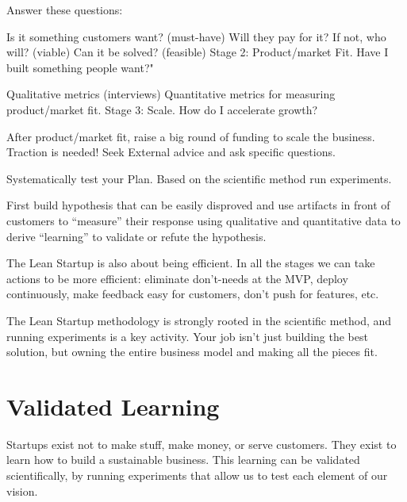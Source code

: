 Answer these questions:

Is it something customers want? (must-have)
Will they pay for it? If not, who will? (viable)
Can it be solved? (feasible)
Stage 2: Product/market Fit.
Have I built something people want?"

Qualitative metrics (interviews)
Quantitative metrics for measuring product/market fit.
Stage 3: Scale.
How do I accelerate growth?

After product/market fit, raise a big round of funding to scale the business. Traction is needed! Seek External advice and ask specific questions.

Systematically test your Plan.
Based on the scientific method run experiments.

First build hypothesis that can be easily disproved and use artifacts in front of customers to “measure” their response using qualitative and quantitative data to derive “learning” to validate or refute the hypothesis.

The Lean Startup is also about being efficient. In all the stages we can take actions to be more efficient: eliminate don’t-needs at the MVP, deploy continuously, make feedback easy for customers, don’t push for features, etc.

The Lean Startup methodology is strongly rooted in the scientific method, and running experiments is a key activity. Your job isn’t just building the best solution, but owning the entire business model and making all the pieces fit.

\section{Validated Learning}

Startups exist not to make stuff, make money, or serve customers. They exist to learn how to build a sustainable business. This learning can be validated scientifically, by running experiments that allow us to test each element of our vision.
